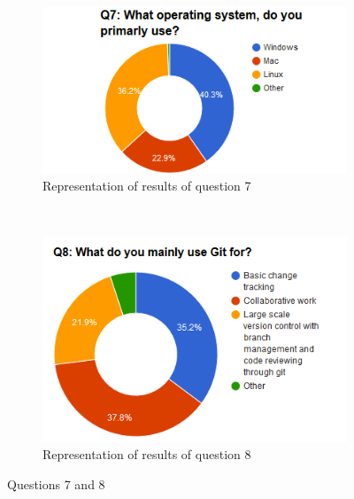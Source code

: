\documentclass[a4paper,oneside]{bth} %
\begin{document}
			\begin{figure}[H]
				\centering
				\begin{subfigure}[b]{0.45\textwidth}
					\includegraphics[width=\textwidth]{graphs/q7.png}
					\caption{Representation of results of question 7}
					\label{fig:q7}
				\end{subfigure}
				~
				\begin{subfigure}[b]{0.45\textwidth}
					\includegraphics[width=\textwidth]{graphs/q8.png}
					\caption{Representation of results of question 8}
					\label{fig:q8}
				\end{subfigure}
				\caption{Questions 7 and 8}\label{fig:q7-q8}
			\end{figure}
\end{document}

